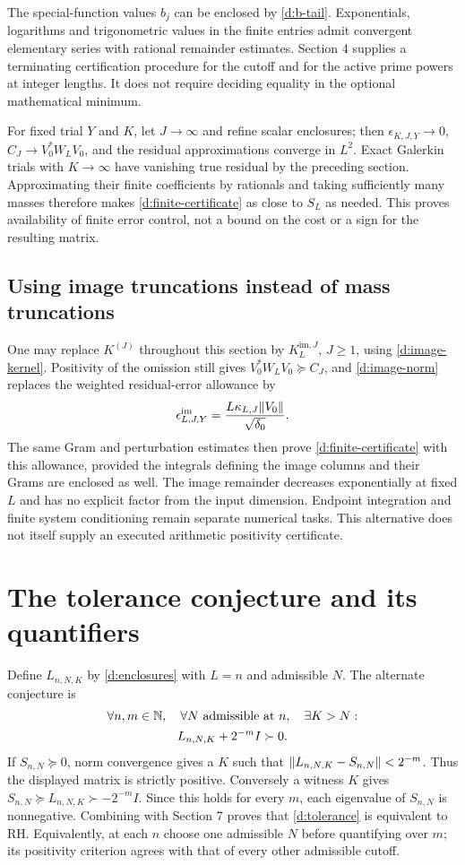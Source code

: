 The special-function values $b_j$ can be enclosed by \eqref{d:b-tail}.
Exponentials, logarithms and trigonometric values in the finite entries
admit convergent elementary series with rational remainder estimates.
Section 4 supplies a terminating certification procedure for the cutoff
and for the active prime powers at integer lengths. It does not require
deciding equality in the optional mathematical minimum.

For fixed trial $Y$ and $K$, let $J\to\infty$ and refine scalar enclosures;
then $\epsilon_{K,J,Y}\to0$, $C_J\to V_0^*W_LV_0$, and the residual
approximations converge in $L^2$. Exact Galerkin trials with $K\to\infty$
have vanishing true residual by the preceding section. Approximating their
finite coefficients by rationals and taking sufficiently many masses
therefore makes \eqref{d:finite-certificate} as close to $S_L$ as needed.
This proves availability of finite error control, not a bound on the cost
or a sign for the resulting matrix.

\subsection{Using image truncations instead of mass truncations}
One may replace $K^{(J)}$ throughout this section by
$K_L^{\mathrm{im},J}$, $J\ge1$, using \eqref{d:image-kernel}.
Positivity of the omission still gives $V_0^*W_LV_0\succeq C_J$, and
\eqref{d:image-norm} replaces the weighted residual-error allowance by
\[
\epsilon^{\mathrm{im}}_{L,J,Y}
=\frac{L\kappa_{L,J}\lVert V_0\rVert}{\sqrt{\delta_0}}.
\]
The same Gram and perturbation estimates then prove
\eqref{d:finite-certificate} with this allowance, provided the integrals
defining the image columns and their Grams are enclosed as well.
The image remainder decreases exponentially at fixed $L$ and has no
explicit factor from the input dimension. Endpoint integration and finite
system conditioning remain separate numerical tasks. This alternative
does not itself supply an executed arithmetic positivity certificate.

\section{The tolerance conjecture and its quantifiers}
Define $L_{n,N,K}$ by \eqref{d:enclosures} with $L=n$ and admissible $N$.
The alternate conjecture is
\begin{equation}\label{d:tolerance}
\begin{gathered}
\forall n,m\in\mathbb N,\quad\forall N\text{ admissible at }n,\quad\exists K>N:\\
L_{n,N,K}+2^{-m}I\succ0.
\end{gathered}
\end{equation}
If $S_{n,N}\succeq0$, norm convergence gives a $K$ such that
$\lVert L_{n,N,K}-S_{n,N}\rVert<2^{-m}$. Thus the displayed matrix is strictly
positive. Conversely a witness $K$ gives
$S_{n,N}\succeq L_{n,N,K}\succ-2^{-m}I$. Since this holds for every $m$,
each eigenvalue of $S_{n,N}$ is nonnegative. Combining with Section 7 proves
that \eqref{d:tolerance} is equivalent to RH.
Equivalently, at each $n$ choose one admissible $N$ before quantifying over
$m$; its positivity criterion agrees with that of every other admissible cutoff.

